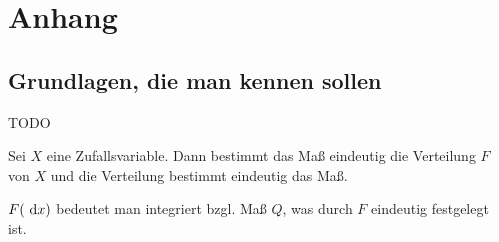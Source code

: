\setcounter{chapter}{0}
\renewcommand{\thechapter}{\Alph{chapter}}
\chapter{Anhang}
\setcounter{equation}{1}
\section{Grundlagen, die man kennen sollen}
TODO

\begin{satz}[Maßkorrespondenzsatz]
Sei $X$ eine Zufallsvariable. 
Dann bestimmt das Maß eindeutig die Verteilung $F$ von $X$ und die Verteilung bestimmt eindeutig das Maß.
\end{satz}

\begin{notation}
$F(\text{ d} x)$ bedeutet man integriert bzgl. Maß $Q$, was durch $F$ eindeutig festgelegt ist.
\end{notation}

\begin{satz}[Transformationsformel]

\end{satz}

\begin{satz}

\end{satz}

\begin{satz}

\end{satz}

\begin{satz}

\end{satz}

